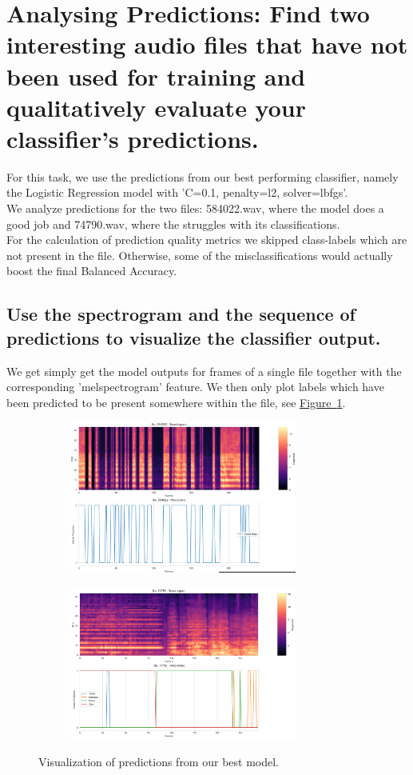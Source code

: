 
\section{Analysing Predictions: {\normalfont\normalsize Find two interesting audio files that have not been used for training and qualitatively evaluate your classifier’s predictions.}}
\label{sec:Analysing Predictions}

For this task, we use the predictions from our best performing classifier, namely the Logistic Regression model with 'C=0.1, penalty=l2, solver=lbfgs'.\\
We analyze predictions for the two files: 584022.wav, where the model does a good job and 74790.wav, where the struggles with its classifications. \\
For the calculation of prediction quality metrics we skipped class-labels which are not present in the file. Otherwise, some of the misclassifications would actually boost the final Balanced Accuracy.


\subsection{Use the spectrogram and the sequence of predictions to visualize the classifier output. }
\label{sec:Analysing Predictions:a}
We get simply get the model outputs for frames of a single file together with the corresponding 'melspectrogram' feature. We then only plot labels which have been predicted to be present somewhere within the file, see \hyperref[fig:6_plots]{Figure~\ref*{fig:6_plots}}.

\begin{figure}[htbp]
  \centering
  \begin{subfigure}[b]{0.49\textwidth}
    \includegraphics[width=\textwidth, height=5cm]{figs/6_good.png}
  \end{subfigure}
  \hfill
  \begin{subfigure}[b]{0.49\textwidth}
    \includegraphics[width=\textwidth, height=5cm]{figs/6_bad.png}
  \end{subfigure}
  \caption{Visualization of predictions from our best model.}
  \label{fig:6_plots}
\end{figure}


